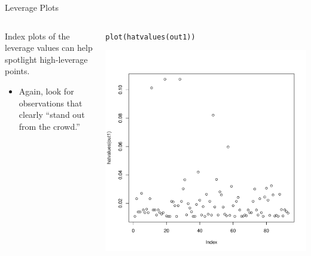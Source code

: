 \documentclass[10pt]{beamer}\usepackage[]{graphicx}\usepackage[]{color}
\makeatletter
\def\maxwidth{ %
  \ifdim\Gin@nat@width>\linewidth
    \linewidth
  \else
    \Gin@nat@width
  \fi
}
\newcommand{\hlstd}[1]{\textcolor[rgb]{0,0,0}{#1}}%
\newcommand{\hlkwd}[1]{\textcolor[rgb]{0.004,0.004,0.506}{#1}}%
\newenvironment{kframe}{%
 \def\at@end@of@kframe{}%
 \ifinner\ifhmode%
  \def\at@end@of@kframe{\end{minipage}}%
  \begin{minipage}{\columnwidth}%
 \fi\fi%
 \def\FrameCommand##1{\hskip\@totalleftmargin \hskip-\fboxsep
 \colorbox{shadecolor}{##1}\hskip-\fboxsep
     \hskip-\linewidth \hskip-\@totalleftmargin \hskip\columnwidth}%
 \MakeFramed {\advance\hsize-\width
   \@totalleftmargin\z@ \linewidth\hsize
   \@setminipage}}%
 {\par\unskip\endMakeFramed%
 \at@end@of@kframe}
\newenvironment{knitrout}{}{} %
\makeatother
\begin{document}
\begin{frame}{Leverage Plots}

  \begin{columns}
    \begin{column}{0.5\textwidth}

      Index plots of the leverage values can help spotlight high-leverage points.
      \vb
      \begin{itemize}
      \item Again, look for observations that clearly ``stand out from the
        crowd.''
      \end{itemize}

    \end{column}

    \begin{column}{0.5\textwidth}

\begin{knitrout}\footnotesize
{}\color{fgcolor}\begin{kframe}
\begin{alltt}
\hlkwd{plot}\hlstd{(}\hlkwd{hatvalues}\hlstd{(out1))}
\end{alltt}
\end{kframe}

{\centering \includegraphics[width=\maxwidth]{figure/assumptions-unnamed-chunk-23-1} 

}


\end{knitrout}



\end{column}
\end{columns}

\end{frame}
\end{document}
